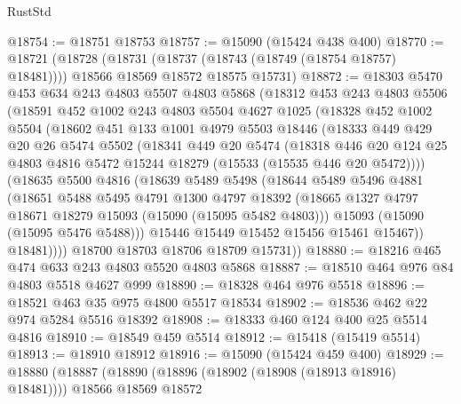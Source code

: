 \begin{lexlean}{RustStd}
\begin{coremodule}
@18754 := @18751 @18753
@18757 := @15090 (@15424 @438 @400)
@18770 := @18721
    (@18728
      (@18731 (@18737 (@18743 (@18749 (@18754 @18757) @18481))))
      @18566
      @18569
      @18572
      @18575
      @15731)
@18872 := @18303
    @5470
    @453
    @634
    @243
    @4803
    @5507
    @4803
    @5868
    (@18312
      @453
      @243
      @4803
      @5506
      (@18591
        @452
        @1002
        @243
        @4803
        @5504
        @4627
        @1025
        (@18328
          @452
          @1002
          @5504
          (@18602
            @451
            @133
            @1001
            @4979
            @5503
            @18446
            (@18333
              @449
              @429
              @20
              @26
              @5474
              @5502
              (@18341
                @449
                @20
                @5474
                (@18318
                  @446
                  @20
                  @124
                  @25
                  @4803
                  @4816
                  @5472
                  @15244
                  @18279
                  (@15533 (@15535 @446 @20 @5472))))
              (@18635
                @5500
                @4816
                (@18639
                  @5489
                  @5498
                  (@18644
                    @5489
                    @5496
                    @4881
                    (@18651
                      @5488
                      @5495
                      @4791
                      @1300
                      @4797
                      @18392
                      (@18665 @1327 @4797 @18671 @18279 @15093 (@15090 (@15095 @5482 @4803)))
                      @15093
                      (@15090 (@15095 @5476 @5488)))
                    @15446
                    @15449
                    @15452
                    @15456
                    @15461
                    @15467))
                @18481))))
        @18700
        @18703
        @18706
        @18709
        @15731))
@18880 := @18216 @465 @474 @633 @243 @4803 @5520 @4803 @5868
@18887 := @18510 @464 @976 @84 @4803 @5518 @4627 @999
@18890 := @18328 @464 @976 @5518
@18896 := @18521 @463 @35 @975 @4800 @5517 @18534
@18902 := @18536 @462 @22 @974 @5284 @5516 @18392
@18908 := @18333 @460 @124 @400 @25 @5514 @4816
@18910 := @18549 @459 @5514
@18912 := @15418 (@15419 @5514)
@18913 := @18910 @18912
@18916 := @15090 (@15424 @459 @400)
@18929 := @18880
    (@18887
      (@18890 (@18896 (@18902 (@18908 (@18913 @18916) @18481))))
      @18566
      @18569
      @18572

\end{coremodule}
\end{lexlean}
